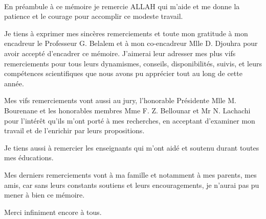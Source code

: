 \thispagestyle{empty}
\begin{center}
\\
\end{center}

\vspace{20mm}


En préambule à ce mémoire je remercie ALLAH qui m’aide et me donne la patience et le courage pour accomplir ce modeste travail.\bigskip

Je tiens à exprimer mes sincères remerciements et toute mon gratitude à mon encadreur le Professeur G. Belalem et à mon co-encadreur Mlle D. Djouhra  pour avoir accepté d’encadrer ce mémoire. J’aimerai leur adresser mes plus vifs remerciements pour tous leurs dynamismes, conseils, disponibilités, suivis, et leurs compétences scientifiques que nous avons pu apprécier tout au long de cette année.\bigskip

Mes vifs remerciements vont aussi au jury, l’honorable Présidente Mlle M. Bourenane et les honorables membres Mme F. Z. Bellounar et Mr N. Lachachi pour l’intérêt qu’ils m’ont porté à mes recherches, en acceptant d’examiner mon travail et de l’enrichir par leurs propositions.\bigskip

Je tiens aussi à remercier les enseignants qui m’ont aidé et soutenu durant toutes mes éducations.\bigskip

Mes derniers remerciements vont à ma famille et notamment à mes parents, mes amis, car sans leurs constants soutiens et leurs encouragements, je n’aurai pas pu mener à bien ce mémoire.\bigskip

Merci infiniment encore à tous.

